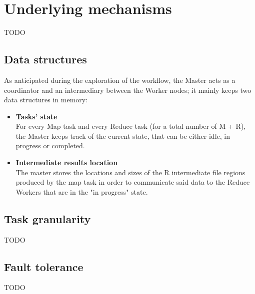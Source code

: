 \section{Underlying mechanisms}
TODO

\subsection{Data structures}
As anticipated during the exploration of the workflow, the Master acts as a coordinator and an intermediary between the Worker nodes; it mainly keeps two data structures in memory:
\begin{itemize}
    \item \textbf{Tasks' state}\\
    For every Map task and every Reduce task (for a total number of M + R), the Master keeps track of the current state, that can be either idle, in progress or completed.
    \item \textbf{Intermediate results location}\\
    The master stores the locations and sizes of the R intermediate file regions produced by the map task in order to communicate said data to the Reduce Workers that are in the "in progress" state.
\end{itemize}

\subsection{Task granularity}
TODO

\subsection{Fault tolerance}
TODO